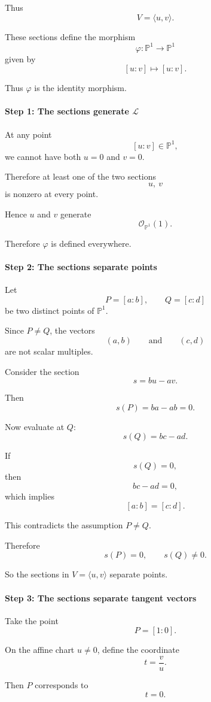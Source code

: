 Thus
\[
V=\langle u,v\rangle.
\]

These sections define the morphism
\[
\varphi:\mathbb P^1\to\mathbb P^1
\]
given by
\[
[u:v]\longmapsto [u:v].
\]

Thus \(\varphi\) is the identity morphism.

\paragraph*{Step 1: The sections generate \(\mathcal L\)}

At any point
\[
[u:v]\in\mathbb P^1,
\]
we cannot have both \(u=0\) and \(v=0\).

Therefore at least one of the two sections
\[
u,\ v
\]
is nonzero at every point.

Hence \(u\) and \(v\) generate
\[
\mathcal O_{\mathbb P^1}(1).
\]

Therefore \(\varphi\) is defined everywhere.

\paragraph*{Step 2: The sections separate points}

Let
\[
P=[a:b],
\qquad
Q=[c:d]
\]
be two distinct points of \(\mathbb P^1\).

Since \(P\neq Q\), the vectors
\[
(a,b)
\qquad\text{and}\qquad
(c,d)
\]
are not scalar multiples.

Consider the section
\[
s=bu-av.
\]

Then
\[
s(P)=ba-ab=0.
\]

Now evaluate at \(Q\):
\[
s(Q)=bc-ad.
\]

If
\[
s(Q)=0,
\]
then
\[
bc-ad=0,
\]
which implies
\[
[a:b]=[c:d].
\]

This contradicts the assumption \(P\neq Q\).

Therefore
\[
s(P)=0,
\qquad
s(Q)\neq0.
\]

So the sections in \(V=\langle u,v\rangle\) separate points.

\paragraph*{Step 3: The sections separate tangent vectors}

Take the point
\[
P=[1:0].
\]

On the affine chart \(u\neq0\), define the coordinate
\[
t=\frac vu.
\]

Then \(P\) corresponds to
\[
t=0.
\]

